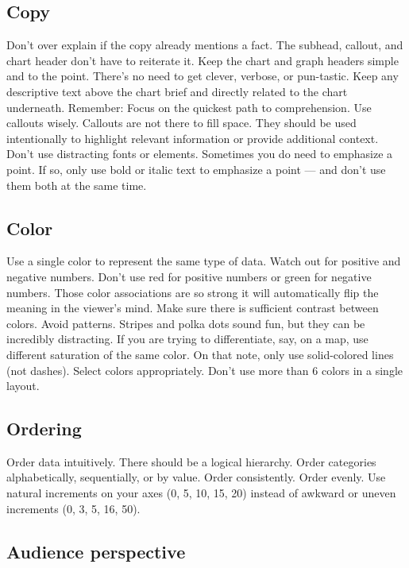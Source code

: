 \documentclass[]{book}
\theoremstyle{definition}
\theoremstyle{definition}
\theoremstyle{definition}
\theoremstyle{remark}
\begin{document}
\subsection{Copy}\label{copy}

Don't over explain if the copy already mentions a fact. The subhead,
callout, and chart header don't have to reiterate it. Keep the chart and
graph headers simple and to the point. There's no need to get clever,
verbose, or pun-tastic. Keep any descriptive text above the chart brief
and directly related to the chart underneath. Remember: Focus on the
quickest path to comprehension. Use callouts wisely. Callouts are not
there to fill space. They should be used intentionally to highlight
relevant information or provide additional context. Don't use
distracting fonts or elements. Sometimes you do need to emphasize a
point. If so, only use bold or italic text to emphasize a point --- and
don't use them both at the same time.

\subsection{Color}\label{color-1}

Use a single color to represent the same type of data. Watch out for
positive and negative numbers. Don't use red for positive numbers or
green for negative numbers. Those color associations are so strong it
will automatically flip the meaning in the viewer's mind. Make sure
there is sufficient contrast between colors. Avoid patterns. Stripes and
polka dots sound fun, but they can be incredibly distracting. If you are
trying to differentiate, say, on a map, use different saturation of the
same color. On that note, only use solid-colored lines (not dashes).
Select colors appropriately. Don't use more than 6 colors in a single
layout.

\subsection{Ordering}\label{ordering}

Order data intuitively. There should be a logical hierarchy. Order
categories alphabetically, sequentially, or by value. Order
consistently. Order evenly. Use natural increments on your axes (0, 5,
10, 15, 20) instead of awkward or uneven increments (0, 3, 5, 16, 50).

\subsection{Audience perspective}\label{audience-perspective}
\end{document}
